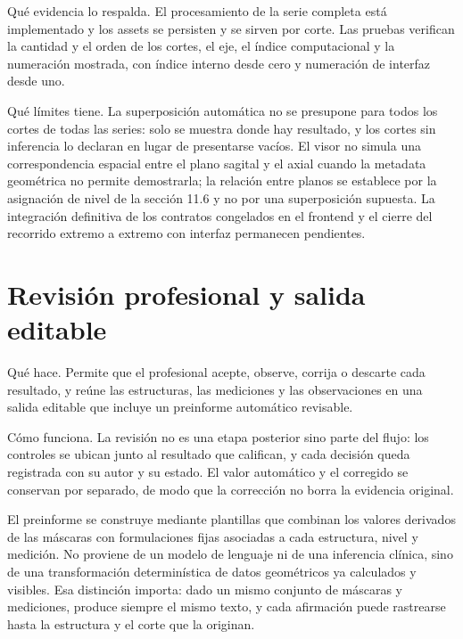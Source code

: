 Qué evidencia lo respalda. El procesamiento de la serie completa está implementado y los assets se persisten y se sirven por corte. Las pruebas verifican la cantidad y el orden de los cortes, el eje, el índice computacional y la numeración mostrada, con índice interno desde cero y numeración de interfaz desde uno.

Qué límites tiene. La superposición automática no se presupone para todos los cortes de todas las series: solo se muestra donde hay resultado, y los cortes sin inferencia lo declaran en lugar de presentarse vacíos. El visor no simula una correspondencia espacial entre el plano sagital y el axial cuando la metadata geométrica no permite demostrarla; la relación entre planos se establece por la asignación de nivel de la sección 11.6 y no por una superposición supuesta. La integración definitiva de los contratos congelados en el frontend y el cierre del recorrido extremo a extremo con interfaz permanecen pendientes.

\section{Revisión profesional y salida editable}

Qué hace. Permite que el profesional acepte, observe, corrija o descarte cada resultado, y reúne las estructuras, las mediciones y las observaciones en una salida editable que incluye un preinforme automático revisable.

Cómo funciona. La revisión no es una etapa posterior sino parte del flujo: los controles se ubican junto al resultado que califican, y cada decisión queda registrada con su autor y su estado. El valor automático y el corregido se conservan por separado, de modo que la corrección no borra la evidencia original.

El preinforme se construye mediante plantillas que combinan los valores derivados de las máscaras con formulaciones fijas asociadas a cada estructura, nivel y medición. No proviene de un modelo de lenguaje ni de una inferencia clínica, sino de una transformación determinística de datos geométricos ya calculados y visibles. Esa distinción importa: dado un mismo conjunto de máscaras y mediciones, produce siempre el mismo texto, y cada afirmación puede rastrearse hasta la estructura y el corte que la originan.


